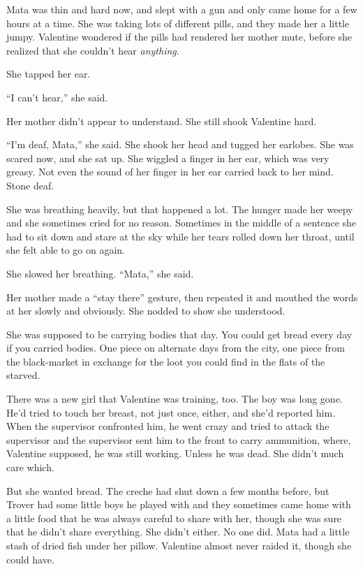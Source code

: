 Mata was thin and hard now, and slept with a gun and only came home
for a few hours at a time. She was taking lots of different pills,
and they made her a little jumpy. Valentine wondered if the pills
had rendered her mother mute, before she realized that she couldn’t
hear \emph{anything}.

She tapped her ear.

“I can’t hear,” she said.

Her mother didn’t appear to understand. She still shook Valentine
hard.

“I’m deaf, Mata,” she said. She shook her head and tugged her
earlobes. She was scared now, and she sat up. She wiggled a finger
in her ear, which was very greasy. Not even the sound of her finger
in her ear carried back to her mind. Stone deaf.

She was breathing heavily, but that happened a lot. The hunger made
her weepy and she sometimes cried for no reason. Sometimes in the
middle of a sentence she had to sit down and stare at the sky while
her tears rolled down her throat, until she felt able to go on
again.

She slowed her breathing. “Mata,” she said.

Her mother made a “stay there” gesture, then repeated it and
mouthed the words at her slowly and obviously. She nodded to show
she understood.

She was supposed to be carrying bodies that day. You could get
bread every day if you carried bodies. One piece on alternate days
from the city, one piece from the black-market in exchange for the
loot you could find in the flats of the starved.

There was a new girl that Valentine was training, too. The boy was
long gone. He’d tried to touch her breast, not just once, either,
and she’d reported him. When the supervisor confronted him, he went
crazy and tried to attack the supervisor and the supervisor sent
him to the front to carry ammunition, where, Valentine supposed, he
was still working. Unless he was dead. She didn’t much care which.

But she wanted bread. The creche had shut down a few months before,
but Trover had some little boys he played with and they sometimes
came home with a little food that he was always careful to share
with her, though she was sure that he didn’t share everything. She
didn’t either. No one did. Mata had a little stash of dried fish
under her pillow. Valentine almost never raided it, though she
could have.

